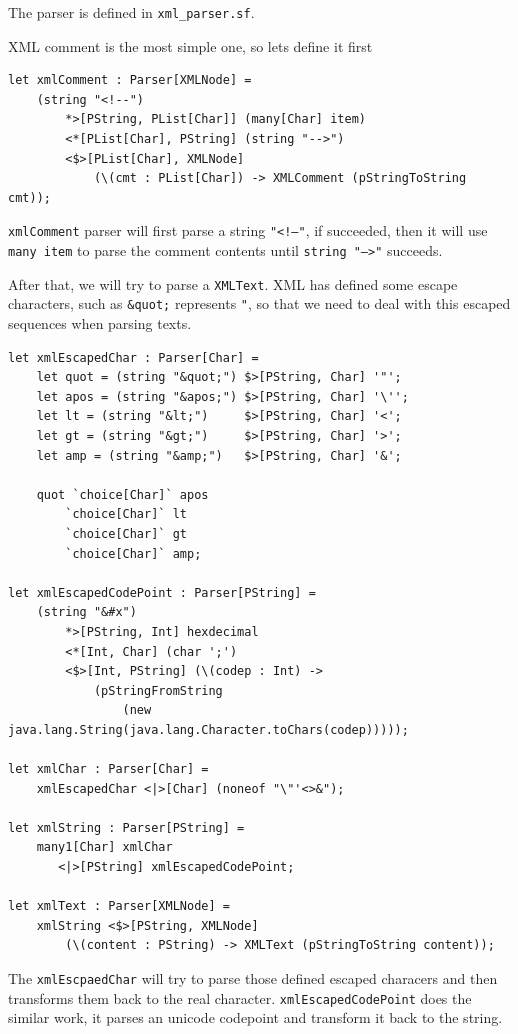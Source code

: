 The parser is defined in \texttt{xml\_parser.sf}.

XML comment is the most simple one, so lets define it first

\begin{lstlisting}
let xmlComment : Parser[XMLNode] =
    (string "<!--")
        *>[PString, PList[Char]] (many[Char] item)
        <*[PList[Char], PString] (string "-->")
        <$>[PList[Char], XMLNode]
            (\(cmt : PList[Char]) -> XMLComment (pStringToString cmt));
\end{lstlisting}

\texttt{xmlComment} parser will first parse a string \texttt{"\textless!--"}, if succeeded, then it will use \texttt{many item} to parse the comment contents until \texttt{string "--\textgreater"} succeeds.

After that, we will try to parse a \texttt{XMLText}. XML has defined some escape characters, such as \texttt{\&quot;} represents \texttt{"}, so that we need to deal with this escaped sequences when parsing texts.

\begin{lstlisting}
let xmlEscapedChar : Parser[Char] =
    let quot = (string "&quot;") $>[PString, Char] '"';
    let apos = (string "&apos;") $>[PString, Char] '\'';
    let lt = (string "&lt;")     $>[PString, Char] '<';
    let gt = (string "&gt;")     $>[PString, Char] '>';
    let amp = (string "&amp;")   $>[PString, Char] '&';

    quot `choice[Char]` apos
        `choice[Char]` lt
        `choice[Char]` gt
        `choice[Char]` amp;

let xmlEscapedCodePoint : Parser[PString] =
    (string "&#x")
        *>[PString, Int] hexdecimal
        <*[Int, Char] (char ';')
        <$>[Int, PString] (\(codep : Int) ->
            (pStringFromString
                (new java.lang.String(java.lang.Character.toChars(codep)))));

let xmlChar : Parser[Char] =
    xmlEscapedChar <|>[Char] (noneof "\"'<>&");

let xmlString : Parser[PString] =
    many1[Char] xmlChar
       <|>[PString] xmlEscapedCodePoint;

let xmlText : Parser[XMLNode] =
    xmlString <$>[PString, XMLNode]
        (\(content : PString) -> XMLText (pStringToString content));
\end{lstlisting}

The \texttt{xmlEscpaedChar} will try to parse those defined escaped characers and then transforms them back to the real character. \texttt{xmlEscapedCodePoint} does the similar work, it parses an unicode codepoint and transform it back to the string.

